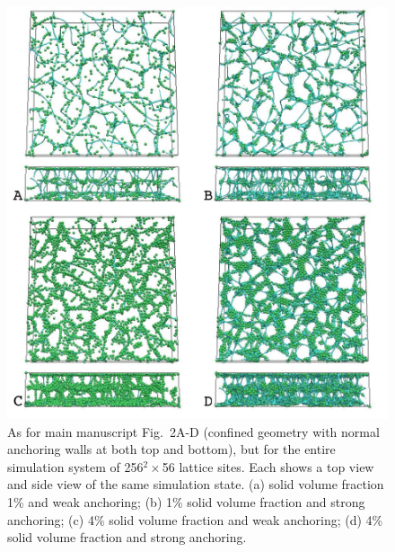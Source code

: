 \documentclass[12pt,twoside]{article}
\begin{document}
\begin{figure}
\begin{center}
\includegraphics[scale=0.42]{s3.jpg}
\end{center}
\caption{As for main manuscript Fig.~2A-D (confined geometry with normal
anchoring walls at both top and bottom), but for the entire simulation
system of 256$^2\times$56 lattice sites. Each shows a top view and
side view of the same simulation state. (a) solid volume fraction 1\%
and weak anchoring; (b) 1\% solid volume fraction and strong anchoring;
(c) 4\% solid volume fraction and weak anchoring; (d) 4\% solid
volume fraction and strong anchoring.}
\end{figure}
\end{document}

